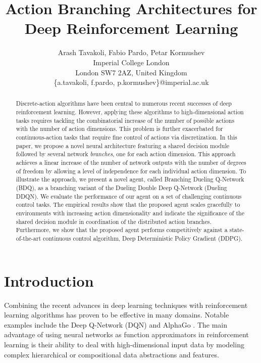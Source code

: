 \documentclass[letterpaper]{article} %
\newcommand{\citep}{\cite}
\begin{document}
\title{Action Branching Architectures for Deep Reinforcement Learning}
\author{Arash Tavakoli, Fabio Pardo, Petar Kormushev\\
Imperial College London\\
London SW7 2AZ, United Kingdom\\
\{a.tavakoli, f.pardo, p.kormushev\}@imperial.ac.uk
}
\maketitle


\begin{abstract}
Discrete-action algorithms have been central to numerous recent successes of deep reinforcement learning. However, applying these algorithms to high-dimensional action tasks requires tackling the combinatorial increase of the number of possible actions with the number of action dimensions. This problem is further exacerbated for continuous-action tasks that require fine control of actions via discretization. In this paper, we propose a novel neural architecture featuring a shared decision module followed by several network \textit{branches}, one for each action dimension. This approach achieves a linear increase of the number of network outputs with the number of degrees of freedom by allowing a level of independence for each individual action dimension. To illustrate the approach, we present a novel agent, called Branching Dueling Q-Network (BDQ), as a branching variant of the Dueling Double Deep Q-Network (Dueling DDQN). We evaluate the performance of our agent on a set of challenging continuous control tasks. The empirical results show that the proposed agent scales gracefully to environments with increasing action dimensionality and indicate the significance of the shared decision module in coordination of the distributed action branches. Furthermore, we show that the proposed agent performs competitively against a state-of-the-art continuous control algorithm, Deep Deterministic Policy Gradient (DDPG).
\end{abstract}


\section{Introduction}
\label{sec:intro}

Combining the recent advances in deep learning techniques \citep{Lecun:2015deep,Schmidhuber:2015NN,Goodfellow:2016DLbook} with reinforcement learning algorithms \citep{Bertsekas:1996neuro,Sutton:1998RLbook,Szepesvari:2010algorithms} has proven to be effective in many domains. Notable examples include the Deep Q-Network (DQN) \citep{Mnih:2013,Mnih:2015natureDQN} and AlphaGo \citep{Silver:2016AlphaGo,Silver:2017AlphaGoZero}. The main advantage of using neural networks as function approximators in reinforcement learning is their ability to deal with high-dimensional input data by modeling complex hierarchical or compositional data abstractions and features.
\end{document}

